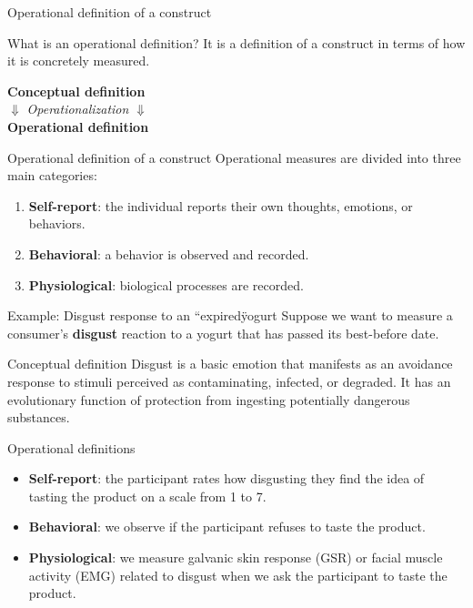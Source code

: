 \documentclass{beamer}
\begin{document}
\begin{frame}{Operational definition of a construct}
  \begin{block}{What is an operational definition?}
    It is a definition of a construct in terms of how it is concretely measured.
  \end{block}
  \pause
\vspace{0.8cm}
  \begin{center}
      \textbf{Conceptual definition} \\
      \bigskip
      $\Downarrow$ \quad \textit{\small Operationalization} \quad $\Downarrow$ \\
      \bigskip
      \textbf{Operational definition} \\
  \end{center}
\end{frame}

  
\begin{frame}{Operational definition of a construct}
  Operational measures are divided into three main categories:
  \begin{enumerate}
      \item \textbf{Self-report}: the individual reports their own thoughts, emotions, or behaviors.
      \item \textbf{Behavioral}: a behavior is observed and recorded.
      \item \textbf{Physiological}: biological processes are recorded.
    \end{enumerate}
\end{frame}

\begin{frame}{Example: Disgust response to an “expired\" yogurt}
\small
  Suppose we want to measure a consumer's \textbf{disgust} reaction to a yogurt that has passed its best-before date.
  \pause
      \begin{block}{Conceptual definition}
    Disgust is a basic emotion that manifests as an avoidance response to stimuli perceived as contaminating, infected, or degraded. It has an evolutionary function of protection from ingesting potentially dangerous substances.
  \end{block}
  \pause
    \begin{block}{Operational definitions}
  \begin{itemize}
    \item \textbf{Self-report}: the participant rates how disgusting they find the idea of tasting the product on a scale from 1 to 7.
    \item \textbf{Behavioral}: we observe if the participant refuses to taste the product.
    \item \textbf{Physiological}: we measure galvanic skin response (GSR) or facial muscle activity (EMG) related to disgust when we ask the participant to taste the product.
  \end{itemize}
\end{block}
\end{frame}
\end{document}
